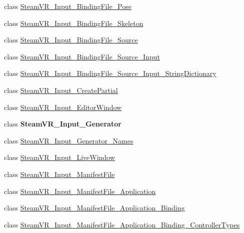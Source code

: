 \begin{DoxyCompactItemize}
\item 
class \mbox{\hyperlink{class_valve_1_1_v_r_1_1_steam_v_r___input___binding_file___pose}{Steam\+V\+R\+\_\+\+Input\+\_\+\+Binding\+File\+\_\+\+Pose}}
\item 
class \mbox{\hyperlink{class_valve_1_1_v_r_1_1_steam_v_r___input___binding_file___skeleton}{Steam\+V\+R\+\_\+\+Input\+\_\+\+Binding\+File\+\_\+\+Skeleton}}
\item 
class \mbox{\hyperlink{class_valve_1_1_v_r_1_1_steam_v_r___input___binding_file___source}{Steam\+V\+R\+\_\+\+Input\+\_\+\+Binding\+File\+\_\+\+Source}}
\item 
class \mbox{\hyperlink{class_valve_1_1_v_r_1_1_steam_v_r___input___binding_file___source___input}{Steam\+V\+R\+\_\+\+Input\+\_\+\+Binding\+File\+\_\+\+Source\+\_\+\+Input}}
\item 
class \mbox{\hyperlink{class_valve_1_1_v_r_1_1_steam_v_r___input___binding_file___source___input___string_dictionary}{Steam\+V\+R\+\_\+\+Input\+\_\+\+Binding\+File\+\_\+\+Source\+\_\+\+Input\+\_\+\+String\+Dictionary}}
\item 
class \mbox{\hyperlink{class_valve_1_1_v_r_1_1_steam_v_r___input___create_partial}{Steam\+V\+R\+\_\+\+Input\+\_\+\+Create\+Partial}}
\item 
class \mbox{\hyperlink{class_valve_1_1_v_r_1_1_steam_v_r___input___editor_window}{Steam\+V\+R\+\_\+\+Input\+\_\+\+Editor\+Window}}
\item 
class {\bfseries Steam\+V\+R\+\_\+\+Input\+\_\+\+Generator}
\item 
class \mbox{\hyperlink{class_valve_1_1_v_r_1_1_steam_v_r___input___generator___names}{Steam\+V\+R\+\_\+\+Input\+\_\+\+Generator\+\_\+\+Names}}
\item 
class \mbox{\hyperlink{class_valve_1_1_v_r_1_1_steam_v_r___input___live_window}{Steam\+V\+R\+\_\+\+Input\+\_\+\+Live\+Window}}
\item 
class \mbox{\hyperlink{class_valve_1_1_v_r_1_1_steam_v_r___input___manifest_file}{Steam\+V\+R\+\_\+\+Input\+\_\+\+Manifest\+File}}
\item 
class \mbox{\hyperlink{class_valve_1_1_v_r_1_1_steam_v_r___input___manifest_file___application}{Steam\+V\+R\+\_\+\+Input\+\_\+\+Manifest\+File\+\_\+\+Application}}
\item 
class \mbox{\hyperlink{class_valve_1_1_v_r_1_1_steam_v_r___input___manifest_file___application___binding}{Steam\+V\+R\+\_\+\+Input\+\_\+\+Manifest\+File\+\_\+\+Application\+\_\+\+Binding}}
\item 
class \mbox{\hyperlink{class_valve_1_1_v_r_1_1_steam_v_r___input___manifest_file___application___binding___controller_types}{Steam\+V\+R\+\_\+\+Input\+\_\+\+Manifest\+File\+\_\+\+Application\+\_\+\+Binding\+\_\+\+Controller\+Types}}

\end{DoxyCompactItemize}
